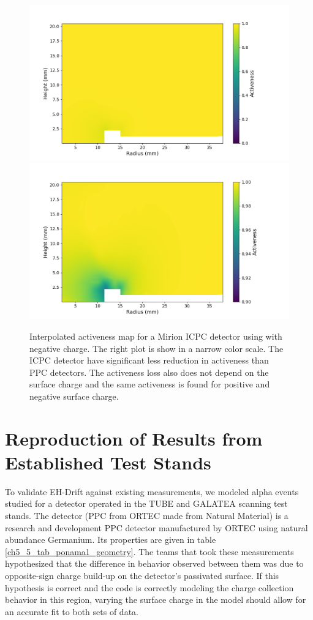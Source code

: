 \begin{figure}%
\centering
\includegraphics[trim={1.0cm 0cm 3.0cm 1cm},clip,width=0.49\linewidth]{ch5/figs/activeness_map_cubic_sc=-0.3_V07647A_5000_linear_full.png}
\includegraphics[trim={1.0cm 0cm 3cm 1cm},clip,width=0.49\linewidth]{ch5/figs/activeness_map_cubic_sc=-0.3_V07647A_5000_linear.png}
\caption{Interpolated activeness map for a Mirion ICPC detector using \ehd with negative charge. The right plot is show in a narrow color scale. The ICPC detector have significant less reduction in activeness than PPC detectors. The activeness loss also does not depend on the surface charge and the same activeness is found for positive and negative surface charge.}
\label{ch5_fig_interpolated_icpc_activeness_map}
\end{figure}


\section{\label{res:1} Reproduction of Results from Established Test Stands}
To validate EH-Drift against existing measurements, we modeled alpha events studied for a detector operated in the TUBE \cite{TUBE_paper} and GALATEA \cite{galatea_paper} scanning test stands. The {\ponama} detector (PPC from ORTEC made from Natural Material) is a research and development PPC detector manufactured by ORTEC using natural abundance Germanium. Its properties are given in table \ref{ch5_5_tab_ponama1_geometry}. The teams that took these measurements hypothesized that the difference in behavior observed between them was due to opposite-sign charge build-up on the detector's passivated surface. If this hypothesis is correct and the {\ehd} code is correctly modeling the charge collection behavior in this region, varying the surface charge in the model should allow for an accurate fit to both sets of data.

